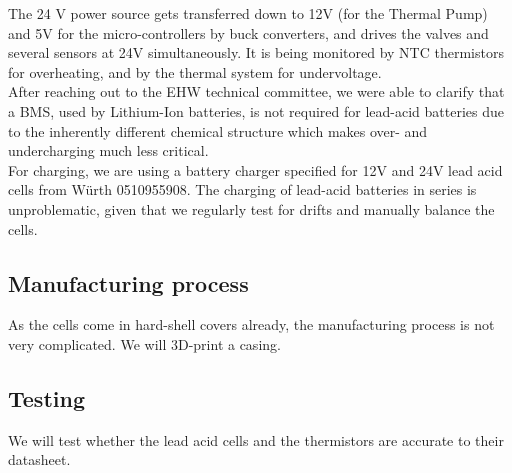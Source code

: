 The 24 V power source gets transferred down to 12V (for the Thermal Pump) and 5V for the micro-controllers by buck converters, and drives the valves and several sensors at 24V simultaneously. It is being monitored by NTC thermistors for overheating, and by the thermal system for undervoltage. \\
After reaching out to the EHW technical committee, we were able to clarify that a BMS, used by Lithium-Ion batteries, is not required for lead-acid batteries due to the inherently different chemical structure which makes over- and undercharging much less critical. \\

For charging, we are using a battery charger specified for 12V and 24V lead acid cells from Würth 0510955908. The charging of lead-acid batteries in series is unproblematic, given that we regularly test for drifts and manually balance the cells.

\subsection{Manufacturing process}
As the cells come in hard-shell covers already, the manufacturing process is not very complicated. We will 3D-print a casing.

\subsection{Testing}
We will test whether the lead acid cells and the thermistors are accurate to their datasheet.
